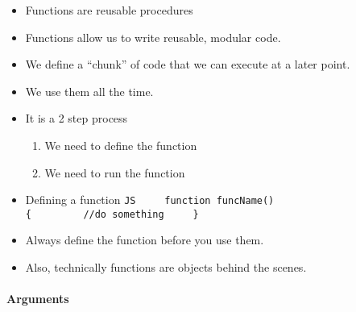\documentclass[
  paper=a4,
  ,captions=tableheading
]{scrartcl}
\providecommand{\tightlist}{%
  \setlength{\itemsep}{0pt}\setlength{\parskip}{0pt}}
\begin{document}
\begin{itemize}
\tightlist
\item
  Functions are reusable procedures
\item
  Functions allow us to write reusable, modular code.
\item
  We define a ``chunk'' of code that we can execute at a later point.
\item
  We use them all the time.
\item
  It is a 2 step process

  \begin{enumerate}
  \def\labelenumi{\arabic{enumi}.}
  \tightlist
  \item
    We need to define the function
  \item
    We need to run the function
  \end{enumerate}
\item
  Defining a function
  \texttt{JS\ \ \ \ \ function\ funcName()\{\ \ \ \ \ \ \ \ \ //do\ something\ \ \ \ \ \}}
\item
  Always define the function before you use them.
\item
  Also, technically functions are objects behind the scenes.
\end{itemize}

\hypertarget{arguments}{%
\paragraph{Arguments}\label{arguments}}
\end{document}
